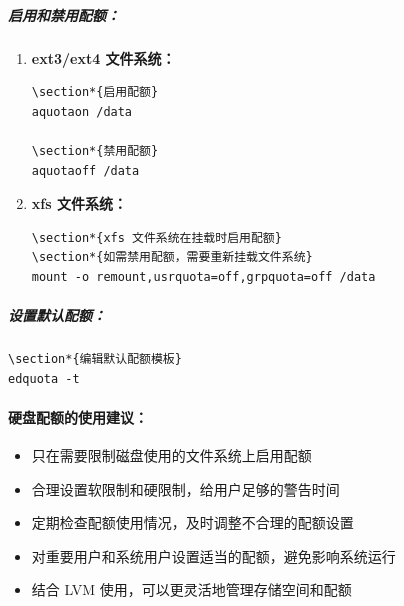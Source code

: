 \documentclass[12pt,UTF8]{ctexbook}
\begin{document}
\subparagraph{启用和禁用配额：}
\begin{enumerate}
    \item \textbf{ext3/ext4 文件系统：}
    \begin{verbatim}
\section*{启用配额}
aquotaon /data

\section*{禁用配额}
aquotaoff /data
    \end{verbatim}
    
    \item \textbf{xfs 文件系统：}
    \begin{verbatim}
\section*{xfs 文件系统在挂载时启用配额}
\section*{如需禁用配额，需要重新挂载文件系统}
mount -o remount,usrquota=off,grpquota=off /data
    \end{verbatim}
\end{enumerate}

\subparagraph{设置默认配额：}
\begin{verbatim}
\section*{编辑默认配额模板}
edquota -t
\end{verbatim}

\paragraph{硬盘配额的使用建议：}
\begin{itemize}
    \item 只在需要限制磁盘使用的文件系统上启用配额
    \item 合理设置软限制和硬限制，给用户足够的警告时间
    \item 定期检查配额使用情况，及时调整不合理的配额设置
    \item 对重要用户和系统用户设置适当的配额，避免影响系统运行
    \item 结合 LVM 使用，可以更灵活地管理存储空间和配额
\end{itemize}
\end{document}
